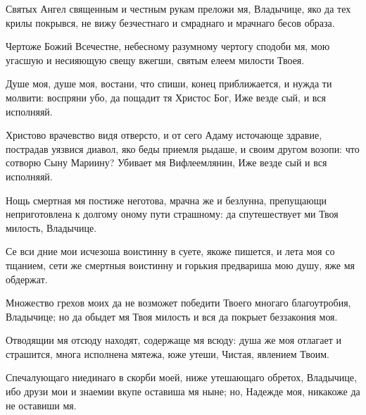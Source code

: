 \begin{mymulticols}
Святых Ангел священным и честным рукам преложи мя, Владычице, яко да тех крилы покрывся, не вижу безчестнаго и смраднаго и мрачнаго бесов образа.

\inyne

Чертоже Божий Всечестне, небесному разумному чертогу сподоби мя, мою угасшую и несияющую свещу вжегши, святым елеем милости Твоея.


Душе моя, душе моя, востани, что спиши, конец приближается, и нужда ти молвити: воспряни убо, да пощадит тя Христос Бог, Иже везде сый, и вся исполняяй.


Христово врачевство видя отверсто, и от сего Адаму источающе здравие, пострадав уязвися диавол, яко беды приемля рыдаше, и своим другом возопи: что сотворю Сыну Мариину? Убивает мя Вифлеемлянин, Иже везде сый и вся исполняяй.




Нощь смертная мя постиже неготова, мрачна же и безлунна, препущающи неприготовлена к долгому оному пути страшному: да спутешествует ми Твоя милость, Владычице.


Се вси дние мои исчезоша воистинну в суете, якоже пишется, и лета моя со тщанием, сети же смертныя воистинну и горькия предвариша мою душу, яже мя обдержат.


Множество грехов моих да не возможет победити Твоего многаго благоутробия, Владычице; но да обыдет мя Твоя милость и вся да покрыет беззакония моя.

\slava

Отводящии мя отсюду находят, содержаще мя всюду: душа же моя отлагает и страшится, многа исполнена мятежа, юже утеши, Чистая, явлением Твоим.

\inyne

Спечалующаго ниединаго в скорби моей, ниже утешающаго обретох, Владычице, ибо друзи мои и знаемии вкупе оставиша мя ныне; но, Надежде моя, никакоже да не оставиши мя.



\end{mymulticols}

